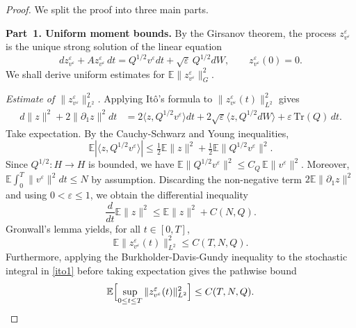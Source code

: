 \documentclass[11pt,a4paper,reqno]{amsart}
\theoremstyle{definition}
\begin{document}
\begin{proof}
  We split the proof into three main parts.

  \medskip
  \noindent\textbf{Part~1. Uniform moment bounds.}
  By the Girsanov theorem, the process $z^\varepsilon_{v^\varepsilon}$ is the unique strong solution of the
  linear equation
  \begin{equation}\label{eq:lin_ctrl}
    dz^\varepsilon_{v^\varepsilon} + A z^\varepsilon_{v^\varepsilon}\,dt
    = Q^{1/2} v^\varepsilon dt + \sqrt\varepsilon\, Q^{1/2} dW, \qquad
    z^\varepsilon_{v^\varepsilon}(0)=0 .
  \end{equation}
  We shall derive uniform estimates for $\mathbb E\|z^\varepsilon_{v^\varepsilon}\|_G^2$.

  \textit{Estimate of $\|z^\varepsilon_{v^\varepsilon}\|_{L^2}^2$.}
  Applying It\^o's formula to $\|z^\varepsilon_{v^\varepsilon}(t)\|_{L^2}^2$ gives
  \begin{align}\label{ito1}
    d\|z\|^2 + 2\|\partial_1 z\|^2 dt
    &= 2\langle z, Q^{1/2} v^\varepsilon\rangle dt
      + 2\sqrt\varepsilon \langle z, Q^{1/2} dW\rangle
      + \varepsilon\,\mathrm{Tr}(Q)\,dt .
  \end{align}
  Take expectation.  By the Cauchy-Schwarz and Young inequalities,
  \[
    \mathbb E|\langle z, Q^{1/2} v^\varepsilon\rangle|
    \le \tfrac12 \mathbb E\|z\|^2 + \tfrac12 \mathbb E\|Q^{1/2} v^\varepsilon\|^2 .
  \]
  Since $Q^{1/2}:H\to H$ is bounded, we have
  $\mathbb E\|Q^{1/2} v^\varepsilon\|^2 \le C_Q\, \mathbb E\|v^\varepsilon\|^2$.
  Moreover, $\mathbb E\int_0^T\|v^\varepsilon\|^2 dt\le N$ by assumption.
  Discarding the non-negative term $2\mathbb E\|\partial_1 z\|^2$ and using
  $0<\varepsilon\le1$, we obtain the differential inequality
  \begin{equation}\label{ineq1}
    \frac{d}{dt}\mathbb E\|z\|^2 \le \mathbb E\|z\|^2 + C(N,Q) .
  \end{equation}
  Gronwall's lemma yields, for all $t\in[0,T]$,
  \begin{equation}\label{L2bound}
    \mathbb E\|z^\varepsilon_{v^\varepsilon}(t)\|_{L^2}^2 \le C(T,N,Q) .
  \end{equation}
  Furthermore, applying the Burkholder-Davis-Gundy inequality to the stochastic
  integral in \eqref{ito1} before taking expectation gives the pathwise bound
  \begin{equation}\label{supL2}
    \mathbb E\Bigl[ \sup_{0\le t\le T}\|z^\varepsilon_{v^\varepsilon}(t)\|_{L^2}^2 \Bigr]
    \le C(T,N,Q) .
  \end{equation}

\end{proof}
\end{document}
